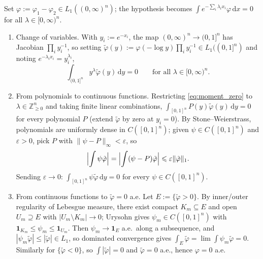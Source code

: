 \documentclass[12pt,a4paper]{article}
\makeatletter
\theoremstyle{definition}
\renewenvironment{proof}[1][\proofname]{\par
  \pushQED{\qed}%
  \normalfont \topsep6\p@\@plus6\p@\relax
  \trivlist
  \item[\hskip\labelsep\bfseries #1\@addpunct{.}]\ignorespaces
}{%
  \popQED\endtrivlist\@endpefalse
}
\newcommand{\dd}{\mathrm{d}}
\makeatother
\begin{document}
\begin{proof}
  Set $\varphi:=\varphi_1-\varphi_2\in L_1((0,\infty)^n)$; the
  hypothesis becomes $\int e^{-\sum_i\lambda_ix_i}\varphi\,\dd x=0$
  for all $\lambda\in[0,\infty)^n$.
  \begin{enumerate}
    \item Change of variables.  With $y_i:=e^{-x_i}$, the map
      $(0,\infty)^n\to(0,1]^n$ has Jacobian $\prod_iy_i^{-1}$, so
      setting
      $\tilde\varphi(y):=\varphi(-\log y)\prod_iy_i^{-1}\in L_1((0,1]^n)$
      and noting $e^{-\lambda_ix_i}=y_i^{\lambda_i}$,
      \begin{equation}\label{eq:moment_zero}
        \int_{(0,1]^n}y^\lambda\tilde\varphi(y)\,\dd y=0
        \qquad\text{for all }\lambda\in[0,\infty)^n.
      \end{equation}

    \item From polynomials to continuous functions.  Restricting
      \eqref{eq:moment_zero} to $\lambda\in\mathbb{Z}_{\geqslant 0}^n$
      and taking finite linear combinations,
      $\int_{[0,1]^n}P(y)\tilde\varphi(y)\,\dd y=0$ for every polynomial
      $P$ (extend $\tilde\varphi$ by zero at $y_i=0$).  By
      Stone--Weierstrass, polynomials are uniformly dense in
      $C([0,1]^n)$; given $\psi\in C([0,1]^n)$ and $\varepsilon>0$,
      pick $P$ with $\|\psi-P\|_\infty<\varepsilon$, so
      \[
        \Bigl|\int\psi\tilde\varphi\Bigr|
        =\Bigl|\int(\psi-P)\tilde\varphi\Bigr|
        \leqslant\varepsilon\|\tilde\varphi\|_1.
      \]
      Sending $\varepsilon\to 0$:
      $\int_{[0,1]^n}\psi\tilde\varphi\,\dd y=0$ for every
      $\psi\in C([0,1]^n)$.

    \item From continuous functions to $\tilde\varphi=0$ a.e.  Let
      $E:=\{\tilde\varphi>0\}$.  By inner/outer regularity of Lebesgue
      measure, there exist compact $K_m\subseteq E$ and open
      $U_m\supseteq E$ with $|U_m\setminus K_m|\to 0$; Urysohn gives
      $\psi_m\in C([0,1]^n)$ with
      $\mathbf{1}_{K_m}\leqslant\psi_m\leqslant\mathbf{1}_{U_m}$.  Then
      $\psi_m\to\mathbf{1}_E$ a.e.\ along a subsequence, and
      $|\psi_m\tilde\varphi|\leqslant|\tilde\varphi|\in L_1$, so
      dominated convergence gives
      $\int_E\tilde\varphi=\lim\int\psi_m\tilde\varphi=0$.  Similarly
      for $\{\tilde\varphi<0\}$, so $\int|\tilde\varphi|=0$ and
      $\tilde\varphi=0$ a.e., hence $\varphi=0$ a.e.
  \end{enumerate}
\end{proof}
\end{document}
